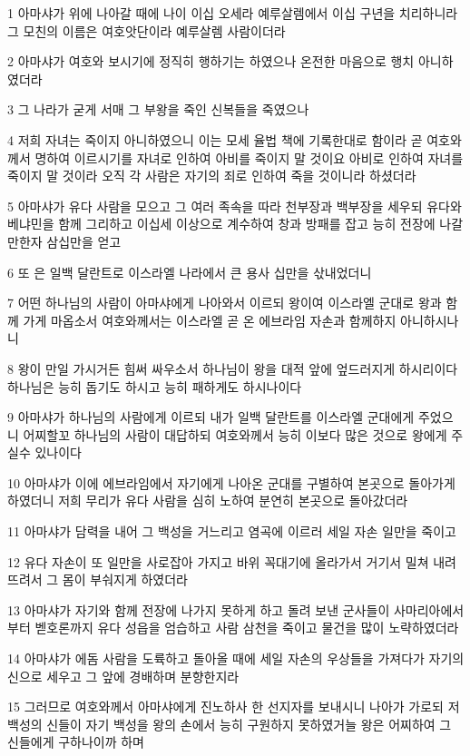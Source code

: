 \par 1 아마샤가 위에 나아갈 때에 나이 이십 오세라 예루살렘에서 이십 구년을 치리하니라 그 모친의 이름은 여호앗단이라 예루살렘 사람이더라
\par 2 아마샤가 여호와 보시기에 정직히 행하기는 하였으나 온전한 마음으로 행치 아니하였더라
\par 3 그 나라가 굳게 서매 그 부왕을 죽인 신복들을 죽였으나
\par 4 저희 자녀는 죽이지 아니하였으니 이는 모세 율법 책에 기록한대로 함이라 곧 여호와께서 명하여 이르시기를 자녀로 인하여 아비를 죽이지 말 것이요 아비로 인하여 자녀를 죽이지 말 것이라 오직 각 사람은 자기의 죄로 인하여 죽을 것이니라 하셨더라
\par 5 아마샤가 유다 사람을 모으고 그 여러 족속을 따라 천부장과 백부장을 세우되 유다와 베냐민을 함께 그리하고 이십세 이상으로 계수하여 창과 방패를 잡고 능히 전장에 나갈만한자 삼십만을 얻고
\par 6 또 은 일백 달란트로 이스라엘 나라에서 큰 용사 십만을 삯내었더니
\par 7 어떤 하나님의 사람이 아마샤에게 나아와서 이르되 왕이여 이스라엘 군대로 왕과 함께 가게 마옵소서 여호와께서는 이스라엘 곧 온 에브라임 자손과 함께하지 아니하시나니
\par 8 왕이 만일 가시거든 힘써 싸우소서 하나님이 왕을 대적 앞에 엎드러지게 하시리이다 하나님은 능히 돕기도 하시고 능히 패하게도 하시나이다
\par 9 아마샤가 하나님의 사람에게 이르되 내가 일백 달란트를 이스라엘 군대에게 주었으니 어찌할꼬 하나님의 사람이 대답하되 여호와께서 능히 이보다 많은 것으로 왕에게 주실수 있나이다
\par 10 아마샤가 이에 에브라임에서 자기에게 나아온 군대를 구별하여 본곳으로 돌아가게 하였더니 저희 무리가 유다 사람을 심히 노하여 분연히 본곳으로 돌아갔더라
\par 11 아마샤가 담력을 내어 그 백성을 거느리고 염곡에 이르러 세일 자손 일만을 죽이고
\par 12 유다 자손이 또 일만을 사로잡아 가지고 바위 꼭대기에 올라가서 거기서 밀쳐 내려뜨려서 그 몸이 부숴지게 하였더라
\par 13 아마샤가 자기와 함께 전장에 나가지 못하게 하고 돌려 보낸 군사들이 사마리아에서부터 벧호론까지 유다 성읍을 엄습하고 사람 삼천을 죽이고 물건을 많이 노략하였더라
\par 14 아마샤가 에돔 사람을 도륙하고 돌아올 때에 세일 자손의 우상들을 가져다가 자기의 신으로 세우고 그 앞에 경배하며 분향한지라
\par 15 그러므로 여호와께서 아마샤에게 진노하사 한 선지자를 보내시니 나아가 가로되 저 백성의 신들이 자기 백성을 왕의 손에서 능히 구원하지 못하였거늘 왕은 어찌하여 그 신들에게 구하나이까 하며
